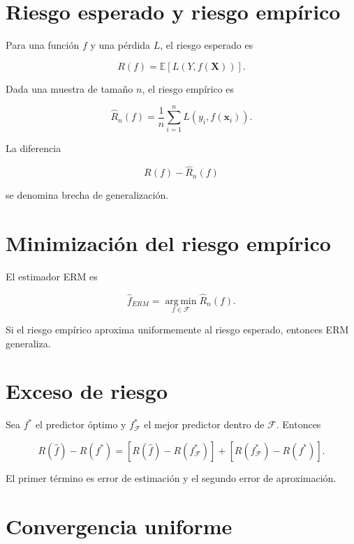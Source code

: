 \documentclass[
  spanish,
  10.5pt,
  letterpaper,
  DIV=11,
  numbers=noendperiod,
  oneside,
  open=any]{scrreprt}
\theoremstyle{definition}
\theoremstyle{definition}
\theoremstyle{plain}
\theoremstyle{remark}
\begin{document}
\section*{Riesgo esperado y riesgo
empírico}\label{riesgo-esperado-y-riesgo-empuxedrico}


Para una función \(f\) y una pérdida \(L\), el riesgo esperado es

\[
R(f)=\mathbb{E}[L(Y,f(\mathbf{X}))].
\]

Dada una muestra de tamaño \(n\), el riesgo empírico es

\[
\widehat R_n(f)=\frac{1}{n}\sum_{i=1}^n L(y_i,f(\mathbf{x}_i)).
\]

La diferencia

\[
R(f)-\widehat R_n(f)
\]

se denomina brecha de generalización.

\section*{Minimización del riesgo
empírico}\label{minimizaciuxf3n-del-riesgo-empuxedrico-1}


El estimador ERM es

\[
\widehat f_{ERM}=\operatorname*{arg\,min}_{f\in\mathcal F}\widehat R_n(f).
\]

Si el riesgo empírico aproxima uniformemente al riesgo esperado,
entonces ERM generaliza.

\section*{Exceso de riesgo}\label{exceso-de-riesgo}


Sea \(f^*\) el predictor óptimo y \(f^*_{\mathcal F}\) el mejor
predictor dentro de \(\mathcal F\). Entonces

\[
R(\widehat f)-R(f^*)=
[R(\widehat f)-R(f^*_{\mathcal F})]+[R(f^*_{\mathcal F})-R(f^*)].
\]

El primer término es error de estimación y el segundo error de
aproximación.

\section*{Convergencia uniforme}\label{convergencia-uniforme}
\end{document}
